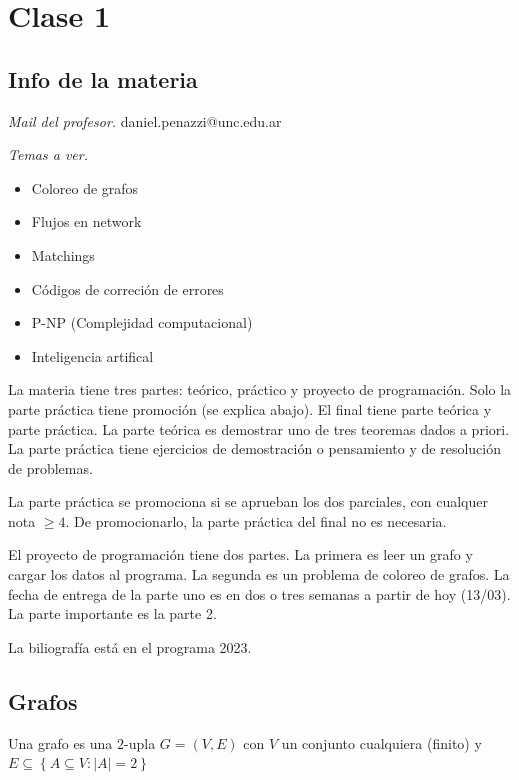 \documentclass[a4paper, 12pt]{article}
\begin{document}
    

\pagebreak

\section{Clase 1}

\subsection{Info de la materia}

\textit{Mail del profesor.} daniel.penazzi@unc.edu.ar

\textit{Temas a ver.}

\begin{itemize}
    \item Coloreo de grafos 
    \item Flujos en network 
    \item Matchings 
    \item Códigos de correción de errores
    \item P-NP (Complejidad computacional)
    \item Inteligencia artifical
\end{itemize}

La materia tiene tres partes: teórico, práctico y proyecto de programación. Solo
la parte práctica tiene promoción (se explica abajo). El final tiene parte
teórica y parte práctica. La parte teórica es demostrar uno de tres teoremas
dados a priori. La parte práctica tiene ejercicios de demostración o pensamiento
y de resolución de problemas.

La parte práctica se promociona si se aprueban los dos parciales, con cualquer
nota $\geq 4$. De promocionarlo, la parte práctica del final no es necesaria.

El proyecto de programación tiene dos partes. La primera es leer un grafo y
cargar los datos al programa. La segunda es un problema de coloreo de grafos. La
fecha de entrega de la parte uno es en dos o tres semanas a partir de hoy
(13/03). La parte importante es la parte 2.

La biliografía está en el programa 2023.

\subsection{Grafos}

\begin{definition}
    Una grafo es una $2$-upla $G = (V, E)$ con $V$ un conjunto cualquiera (finito) y $E
    \subseteq \left\{ A \subseteq V : |A| = 2 \right\} $
\end{definition}
\end{document}
